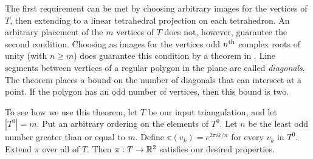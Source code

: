 The first requirement can be met by choosing arbitrary images for the vertices of $T$, then extending to a linear tetrahedral projection on each tetrahedron.
An arbitrary placement of the $m$ vertices of $T$ does not, however, guarantee the second condition.
Choosing as images for the vertices odd $n^{\text{th}}$ complex roots of unity (with $n\geq m$) does guarantee this condition by a theorem in \cite{PoonRub98}.
Line segments between vertices of a regular polygon in the plane are called \emph{diagonals}.
The theorem places a bound on the number of diagonals that can intersect at a point.
If the polygon has an odd number of vertices, then this bound is two.

To see how we use this theorem, let $T$ be our input triangulation, and let $|T^0|=m$.
Put an arbitrary ordering on the elements of $T^0$.
Let $n$ be the least odd number greater than or equal to $m$.
Define $\pi(v_k)=e^{2\pi i k/n}$ for every $v_k$ in $T^0$.
Extend $\pi$ over all of $T$.
Then $\pi:T\to\mathbb{R}^2$ satisfies our desired properties.

